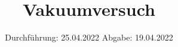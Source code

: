 

\subject{V70}
\title{Vakuumversuch}
\date{%
  Durchführung: 25.04.2022
  \hspace{3em}
  Abgabe: 19.04.2022
}



\maketitle
\thispagestyle{empty}
\tableofcontents
\newpage






\printbibliography{}




